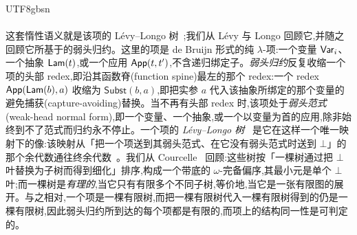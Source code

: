 \begin{CJK*}{UTF8}{gbsn}
  \paragraph{}
  \ifPaperChinese
  这套惰性语义就是该项的 Lévy--Longo 树~\cite{longo1983-set-theoretical-models, levy1978-reductions-lambda-calcul};我们从 Lévy 与 Longo 回顾它,并随之回顾它所基于的弱头归约。这里的项是 de Bruijn 形式的纯 $\lambda$-项:一个变量 $\mathsf{Var}_i$、一个抽象 $\mathsf{Lam}(t)$,或一个应用 $\mathsf{App}(t, t')$,不含递归绑定子。\emph{弱头归约}反复收缩一个项的头部 redex,即沿其函数脊(function spine)最左的那个 redex:一个 redex $\mathsf{App}(\mathsf{Lam}(b), a)$ 收缩为 $\textsf{Subst}(b, a)$,即把实参 $a$ 代入该抽象所绑定的那个变量的避免捕获(capture-avoiding)替换。当不再有头部 redex 时,该项处于\emph{弱头范式}(weak-head normal form),即一个变量、一个抽象,或一个以变量为首的应用,除非始终到不了范式而归约永不停止。一个项的 \emph{Lévy--Longo 树}~\cite{barendregt1984-lambda-calculus, wadsworth1971-semantics-lambda-calculus, abramsky1993-full-abstraction-lazy-lambda} 是它在这样一个唯一映射下的像:该映射从「把一个项送到其弱头范式、在它没有弱头范式时送到 $\bot$」的那个余代数通往终余代数~\cite{kurz2013-nominal-coalgebraic-data-types}。我们从 Courcelle~\cite{courcelle1983-infinite-trees} 回顾:这些树按「一棵树通过把 $\bot$ 叶替换为子树而得到细化」排序,构成一个带底的 $\omega$-完备偏序,其最小元是单个 $\bot$ 叶;而一棵树是\emph{有理的},当它只有有限多个不同子树,等价地,当它是一张有限图的展开。与之相对,一个项是一棵有限树,而把一棵有限树代入一棵有限树得到的仍是一棵有限树,因此弱头归约所到达的每个项都是有限的,而项上的结构同一性是可判定的。
  \else

\end{CJK*}
